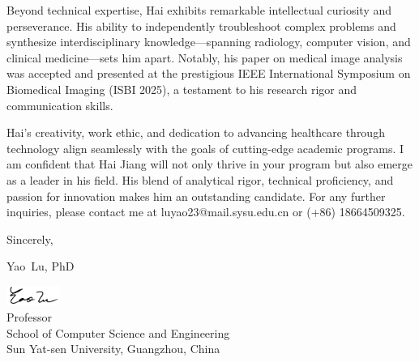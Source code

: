 \documentclass{article}
\begin{document}
Beyond technical expertise, Hai exhibits remarkable intellectual curiosity and perseverance. 
His ability to independently troubleshoot complex problems and synthesize interdisciplinary knowledge—spanning radiology, computer vision, and clinical medicine—sets him apart. 
Notably, his paper on medical image analysis was accepted and presented at the prestigious IEEE International Symposium on Biomedical Imaging (ISBI 2025), a testament to his research rigor and communication skills.

Hai's creativity, work ethic, and dedication to advancing healthcare through technology align seamlessly with the goals of cutting-edge academic programs.
I am confident that Hai Jiang will not only thrive in your program but also emerge as a leader in his field. His blend of analytical rigor, technical proficiency, and passion for innovation makes him an outstanding candidate. 
For any further inquiries, please contact me at luyao23@mail.sysu.edu.cn or (+86) 18664509325.
 


\bigskip %



\begin{FlushLeft}
Sincerely,
\vspace{15pt} %

Yao~Lu, PhD\\
\vspace{5pt}

\includegraphics[width=0.13\textwidth]{signature.png}\\ %
\vspace{5pt}
Professor\\
School of Computer Science and Engineering\\
Sun Yat-sen University, Guangzhou, China\\
\end{FlushLeft}


\begin{FlushLeft}
\end{FlushLeft}
\end{document}

